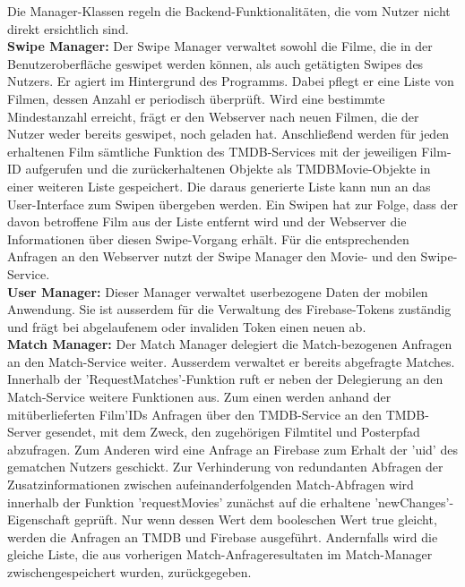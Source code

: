 Die Manager-Klassen regeln die Backend-Funktionalitäten, die vom Nutzer nicht direkt ersichtlich sind. \\

\noindent
\textbf{Swipe Manager: }
Der Swipe Manager verwaltet sowohl die Filme, die in der Benutzeroberfläche geswipet werden können, als auch getätigten Swipes des Nutzers. Er agiert im Hintergrund des Programms. Dabei pflegt er eine Liste von Filmen, dessen Anzahl er periodisch überprüft. Wird eine bestimmte Mindestanzahl erreicht, frägt er den Webserver nach neuen Filmen, die der Nutzer weder bereits geswipet, noch geladen hat. 
Anschließend werden für jeden erhaltenen Film sämtliche Funktion des TMDB-Services mit der jeweiligen Film-ID aufgerufen und die zurückerhaltenen Objekte als TMDBMovie-Objekte in einer weiteren Liste gespeichert. Die daraus generierte Liste kann nun an das User-Interface zum Swipen übergeben werden.
Ein Swipen hat zur Folge, dass der davon betroffene Film aus der Liste entfernt wird und der Webserver die Informationen über diesen Swipe-Vorgang erhält.
Für die entsprechenden Anfragen an den Webserver nutzt der Swipe Manager den Movie- und den Swipe-Service. \\

\noindent
\textbf{User Manager:}
Dieser Manager verwaltet userbezogene Daten der mobilen Anwendung. Sie ist ausserdem für die Verwaltung des Firebase-Tokens zuständig und frägt bei abgelaufenem oder invaliden Token einen neuen ab. \\

\noindent
\textbf{Match Manager:}
Der Match Manager delegiert die Match-bezogenen Anfragen an den Match-Service weiter. Ausserdem verwaltet er bereits abgefragte Matches. Innerhalb der 'RequestMatches'-Funktion ruft er neben der Delegierung an den Match-Service weitere Funktionen aus. Zum einen werden anhand der mitüberlieferten Film'IDs Anfragen über den TMDB-Service an den TMDB-Server gesendet, mit dem Zweck, den zugehörigen Filmtitel und Posterpfad abzufragen. Zum Anderen wird eine Anfrage an Firebase zum Erhalt der 'uid' des gematchen Nutzers geschickt.
Zur Verhinderung von redundanten Abfragen der Zusatzinformationen zwischen aufeinanderfolgenden Match-Abfragen wird innerhalb der Funktion 'requestMovies' zunächst auf die erhaltene 'newChanges'-Eigenschaft geprüft. Nur wenn dessen Wert dem booleschen Wert true gleicht, werden die Anfragen an TMDB und Firebase ausgeführt. Andernfalls wird die gleiche Liste, die aus vorherigen Match-Anfrageresultaten im Match-Manager zwischengespeichert wurden, zurückgegeben. \\